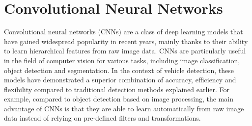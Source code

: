 







\section{Convolutional Neural Networks}
\label{CNNs}


Convolutional neural networks (CNNs) are a class of deep learning models that
have gained widespread popularity in recent years, mainly thanks to their
ability to learn hierarchical features from raw image data. CNNs are
particularly useful in the field of computer vision for various tasks, including
image classification, object detection and segmentation. In the context of
vehicle detection, these models have demonstrated a superior combination of
accuracy, efficiency and flexibility compared to traditional detection methods
explained earlier. For example, compared to object detection based on image
processing, the main advantage of CNNs is that they are able to learn
automatically from raw image data instead of relying on pre-defined filters and
transformations. \cite{Li2022}


